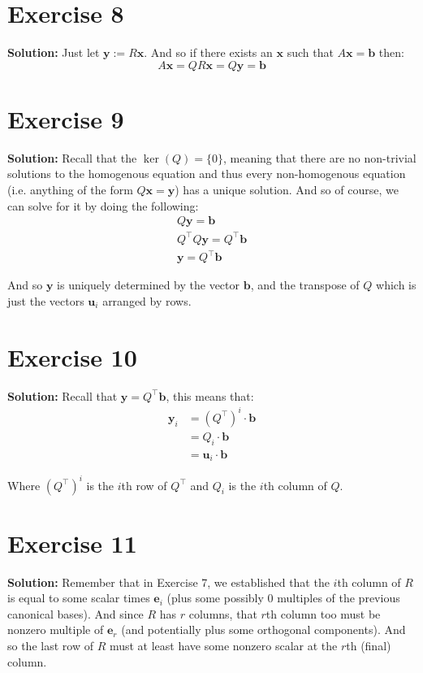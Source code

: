 \documentclass{article}
\newcommand{\mbf}[1]{\mathbf #1}
\begin{document}
\section*{Exercise 8}
\textbf{Solution:} Just let $\mbf y:=R\mbf x$. And so if there exists an $\mbf x$ such that $A\mbf x=\mbf b$ then:
$$A\mbf x=QR\mbf x=Q\mbf y=\mbf b$$

\section*{Exercise 9}
\textbf{Solution:} Recall that the $\operatorname{ker}(Q)=\{0\}$, meaning that there are no non-trivial solutions to the homogenous equation and thus every non-homogenous equation (i.e. anything of the form $Q\mbf x=\mbf y$) has a unique solution. And so of course, we can solve for it by doing the following:
\begin{align*}
  Q\mbf y=\mbf b\\
  Q^\top Q\mbf y=Q^\top\mbf b\\
  \mbf y=Q^\top\mbf b
\end{align*}

And so $\mbf y$ is uniquely determined by the vector $\mbf b$, and the transpose of $Q$ which is just the vectors $\mbf u_i$ arranged by rows.

\section*{Exercise 10}
\textbf{Solution:} Recall that $\mbf y=Q^\top\mbf b$, this means that:
\begin{align*}
  \mbf y_i&=(Q^\top)^i\cdot\mbf b\\
  &=Q_i\cdot\mbf b\\
  &=\mbf u_i\cdot\mbf b
\end{align*}

Where $(Q^\top)^i$ is the $i$th row of $Q^\top$ and $Q_i$ is the $i$th column of $Q$.

\section*{Exercise 11}
\textbf{Solution:} Remember that in Exercise 7, we established that the $i$th column of $R$ is equal to some scalar times $\mbf e_i$ (plus some possibly 0 multiples of the previous canonical bases). And since $R$ has $r$ columns, that $r$th column too must be nonzero multiple of $\mbf e_r$ (and potentially plus some orthogonal components). And so the last row of $R$ must at least have some nonzero scalar at the $r$th (final) column.
\end{document}
